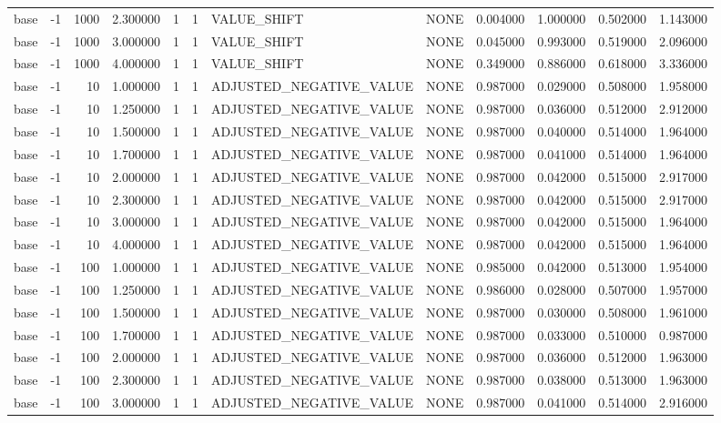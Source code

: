 \begin{tabular}{lrrrllllrrrr}
base & -1 & 1000 & 2.300000 & 1 & 1 & VALUE_SHIFT & NONE & 0.004000 & 1.000000 & 0.502000 & 1.143000 \\
base & -1 & 1000 & 3.000000 & 1 & 1 & VALUE_SHIFT & NONE & 0.045000 & 0.993000 & 0.519000 & 2.096000 \\
base & -1 & 1000 & 4.000000 & 1 & 1 & VALUE_SHIFT & NONE & 0.349000 & 0.886000 & 0.618000 & 3.336000 \\
base & -1 & 10 & 1.000000 & 1 & 1 & ADJUSTED_NEGATIVE_VALUE & NONE & 0.987000 & 0.029000 & 0.508000 & 1.958000 \\
base & -1 & 10 & 1.250000 & 1 & 1 & ADJUSTED_NEGATIVE_VALUE & NONE & 0.987000 & 0.036000 & 0.512000 & 2.912000 \\
base & -1 & 10 & 1.500000 & 1 & 1 & ADJUSTED_NEGATIVE_VALUE & NONE & 0.987000 & 0.040000 & 0.514000 & 1.964000 \\
base & -1 & 10 & 1.700000 & 1 & 1 & ADJUSTED_NEGATIVE_VALUE & NONE & 0.987000 & 0.041000 & 0.514000 & 1.964000 \\
base & -1 & 10 & 2.000000 & 1 & 1 & ADJUSTED_NEGATIVE_VALUE & NONE & 0.987000 & 0.042000 & 0.515000 & 2.917000 \\
base & -1 & 10 & 2.300000 & 1 & 1 & ADJUSTED_NEGATIVE_VALUE & NONE & 0.987000 & 0.042000 & 0.515000 & 2.917000 \\
base & -1 & 10 & 3.000000 & 1 & 1 & ADJUSTED_NEGATIVE_VALUE & NONE & 0.987000 & 0.042000 & 0.515000 & 1.964000 \\
base & -1 & 10 & 4.000000 & 1 & 1 & ADJUSTED_NEGATIVE_VALUE & NONE & 0.987000 & 0.042000 & 0.515000 & 1.964000 \\
base & -1 & 100 & 1.000000 & 1 & 1 & ADJUSTED_NEGATIVE_VALUE & NONE & 0.985000 & 0.042000 & 0.513000 & 1.954000 \\
base & -1 & 100 & 1.250000 & 1 & 1 & ADJUSTED_NEGATIVE_VALUE & NONE & 0.986000 & 0.028000 & 0.507000 & 1.957000 \\
base & -1 & 100 & 1.500000 & 1 & 1 & ADJUSTED_NEGATIVE_VALUE & NONE & 0.987000 & 0.030000 & 0.508000 & 1.961000 \\
base & -1 & 100 & 1.700000 & 1 & 1 & ADJUSTED_NEGATIVE_VALUE & NONE & 0.987000 & 0.033000 & 0.510000 & 0.987000 \\
base & -1 & 100 & 2.000000 & 1 & 1 & ADJUSTED_NEGATIVE_VALUE & NONE & 0.987000 & 0.036000 & 0.512000 & 1.963000 \\
base & -1 & 100 & 2.300000 & 1 & 1 & ADJUSTED_NEGATIVE_VALUE & NONE & 0.987000 & 0.038000 & 0.513000 & 1.963000 \\
base & -1 & 100 & 3.000000 & 1 & 1 & ADJUSTED_NEGATIVE_VALUE & NONE & 0.987000 & 0.041000 & 0.514000 & 2.916000 \\

\end{tabular}

